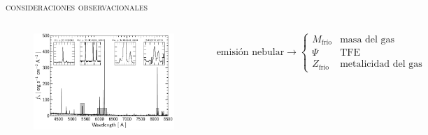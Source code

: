 \documentclass[xcolor=dvipsnames,4pt,fleqn,hyperref={colorlinks,citecolor=black,linkcolor=black,urlcolor=black}]{beamer}
\begin{document}
\begin{frame}{\textsc{consideraciones observacionales}}
\begin{columns}
\begin{figure}
\includegraphics[scale=0.61]{img/hayes2016-2}
\end{figure}

\begin{equation*}
\text{emisión nebular}\longrightarrow
\begin{cases}
M_\text{frío} & \text{masa del gas} \\
\Psi          & \text{TFE}          \\
Z_\text{frío} & \text{metalicidad del gas}
\end{cases}
\end{equation*}
\end{columns}

\end{frame}
\end{document}
